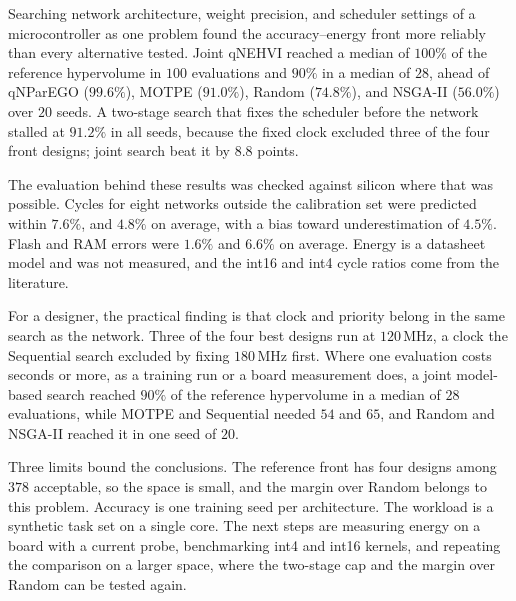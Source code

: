 
Searching network architecture, weight precision, and scheduler settings of
a microcontroller as one problem found the accuracy--energy front more
reliably than every alternative tested. Joint qNEHVI reached a median of
$100\%$ of the reference hypervolume in $100$ evaluations and $90\%$ in a
median of $28$, ahead of qNParEGO ($99.6\%$), MOTPE ($91.0\%$), Random
($74.8\%$), and NSGA-II ($56.0\%$) over $20$ seeds. A two-stage search that fixes
the scheduler before the network stalled at $91.2\%$ in all seeds, because the
fixed clock excluded three of the four front designs; joint search beat it by
$8.8$ points.

The evaluation behind these results was checked against silicon where
that was possible. Cycles for eight networks outside the calibration set were
predicted within $7.6\%$, and $4.8\%$ on average, with a bias toward
underestimation of $4.5\%$. Flash and RAM errors were $1.6\%$ and $6.6\%$
on average. Energy is a datasheet model and was not measured, and the int16
and int4 cycle ratios come from the literature.

For a designer, the practical finding is that clock and priority belong in
the same search as the network. Three of the four best designs run at
$120$\,MHz, a clock the Sequential search excluded by fixing $180$\,MHz first.
Where one evaluation costs seconds or more, as a training run or a board
measurement does, a joint model-based search reached $90\%$ of the reference
hypervolume in a median of $28$ evaluations, while MOTPE and
Sequential needed $54$ and $65$, and Random and NSGA-II reached it in one
seed of $20$.

Three limits bound the conclusions. The reference front has four designs
among $378$ acceptable, so the space is small, and the margin over Random
belongs to this problem. Accuracy is one training seed per architecture. The
workload is a synthetic task set on a single core. The next steps are
measuring energy on a board with a current probe, benchmarking int4 and int16
kernels, and repeating the comparison on a larger space, where the two-stage
cap and the margin over Random can be tested again.
